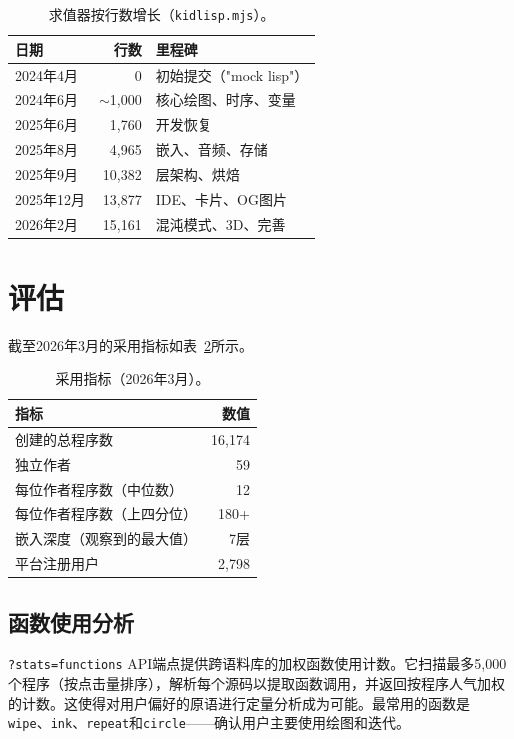 \documentclass[10pt,letterpaper,twocolumn]{article}
\begin{document}
\begin{table}[h]
\small
\centering
\begin{tabular}{lrl}
\toprule
\textbf{日期} & \textbf{行数} & \textbf{里程碑} \\
\midrule
2024年4月 & 0 & 初始提交（"mock lisp"） \\
2024年6月 & $\sim$1{,}000 & 核心绘图、时序、变量 \\
2025年6月 & 1{,}760 & 开发恢复 \\
2025年8月 & 4{,}965 & 嵌入、音频、存储 \\
2025年9月 & 10{,}382 & 层架构、烘焙 \\
2025年12月 & 13{,}877 & IDE、卡片、OG图片 \\
2026年2月 & 15{,}161 & 混沌模式、3D、完善 \\
\bottomrule
\end{tabular}
\caption{求值器按行数增长（\texttt{kidlisp.mjs}）。}
\label{tab:growth}
\end{table}

\section{评估}
\label{sec:evaluation}

截至2026年3月的采用指标如表~\ref{tab:adoption}所示。

\begin{table}[h]
\small
\centering
\begin{tabular}{lr}
\toprule
\textbf{指标} & \textbf{数值} \\
\midrule
创建的总程序数 & 16,174 \\
独立作者 & 59 \\
每位作者程序数（中位数） & 12 \\
每位作者程序数（上四分位） & 180+ \\
嵌入深度（观察到的最大值） & 7层 \\
平台注册用户 & 2,798 \\
\bottomrule
\end{tabular}
\caption{采用指标（2026年3月）。}
\label{tab:adoption}
\end{table}

\subsection{函数使用分析}

\texttt{?stats=functions} API端点提供跨语料库的加权函数使用计数。它扫描最多5,000个程序（按点击量排序），解析每个源码以提取函数调用，并返回按程序人气加权的计数。这使得对用户偏好的原语进行定量分析成为可能。最常用的函数是\texttt{wipe}、\texttt{ink}、\texttt{repeat}和\texttt{circle}——确认用户主要使用绘图和迭代。
\end{document}
